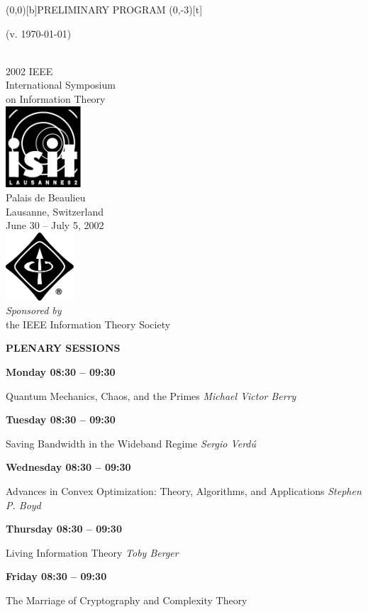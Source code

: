 \documentclass[a5paper,twoside]{article}
\def\papertitle#1{#1\hfil\break}
\def\plenaryspeaker#1{{\itshape #1}\par\filbreak\vspace{\medskipamount}}
\begin{document}
\pagestyle{myheadings}
\sf
\thispagestyle{empty}
\mbox{}
\begin{center}
\Large
{\LARGE \makebox(0,0)[b]{PRELIMINARY PROGRAM}%
\makebox(0,-3)[t]{\scriptsize(v. \today)\strut}}\\
\vfill
2002 IEEE\\
International Symposium\\
on Information Theory\\
\vfill
\includegraphics[width=1.1in]{isit-bw}\\
\vfill
Palais de Beaulieu\\
Lausanne, Switzerland\\[3ex]
June 30 -- July 5, 2002\\
\vfill
\includegraphics[width=1.0in]{ieee}\\
\vfill
{\itshape Sponsored by}\\
the IEEE Information Theory Society
\end{center}
\clearpage
\thispagestyle{empty}\null\clearpage\setcounter{page}{1}
\raggedright
{\large\bfseries PLENARY SESSIONS}\par\bigskip
{\bfseries Monday 08:30 -- 09:30}\par
\papertitle{Quantum Mechanics, Chaos, and the Primes}
\plenaryspeaker{Michael Victor Berry}
{\bfseries Tuesday 08:30 -- 09:30}\par
\papertitle{Saving Bandwidth in the Wideband Regime}
\plenaryspeaker{Sergio Verd\'u}
{\bfseries Wednesday 08:30 -- 09:30}\par
\papertitle{Advances in Convex Optimization: Theory, Algorithms, and Applications}
\plenaryspeaker{Stephen P. Boyd}
{\bfseries Thursday 08:30 -- 09:30}\par
\papertitle{Living Information Theory}
\plenaryspeaker{Toby Berger}
{\bfseries Friday 08:30 -- 09:30}\par
\papertitle{The Marriage of Cryptography and Complexity Theory}
\end{document}

